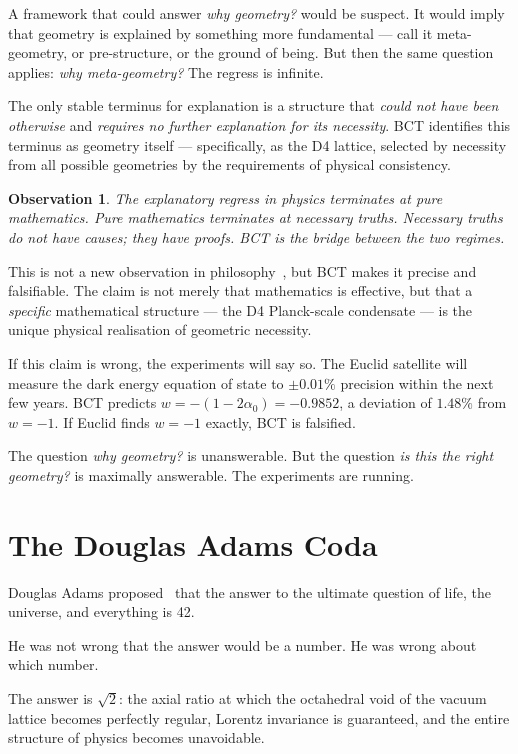 \documentclass[aps,prl,twocolumn,superscriptaddress,floatfix]{revtex4-2}
\newtheorem{observation}{Observation}
\newcommand{\azero}{\alpha_0}
\begin{document}
A framework that could answer \emph{why geometry?} would be suspect. 
It would imply that geometry is explained by something more 
fundamental --- call it meta-geometry, or pre-structure, or the 
ground of being. But then the same question applies: \emph{why 
meta-geometry?} The regress is infinite.

The only stable terminus for explanation is a structure that 
\emph{could not have been otherwise} and \emph{requires no further 
explanation for its necessity}. BCT identifies this terminus as 
geometry itself --- specifically, as the D4 lattice, selected by 
necessity from all possible geometries by the requirements of 
physical consistency.

\begin{observation}
The explanatory regress in physics terminates at pure mathematics. 
Pure mathematics terminates at necessary truths. Necessary truths 
do not have causes; they have proofs. BCT is the bridge between 
the two regimes.
\end{observation}

This is not a new observation in philosophy~\cite{Putnam1975}, 
but BCT makes it precise and falsifiable. The claim is not 
merely that mathematics is effective, but that a \emph{specific} 
mathematical structure --- the D4 Planck-scale condensate --- 
is the unique physical realisation of geometric necessity.

If this claim is wrong, the experiments will say so. The Euclid 
satellite will measure the dark energy equation of state to 
$\pm 0.01\%$ precision within the next few years. BCT predicts 
$w = -(1-2\azero) = -0.9852$, a deviation of $1.48\%$ from 
$w = -1$. If Euclid finds $w = -1$ exactly, BCT is falsified.

The question \emph{why geometry?} is unanswerable. But the 
question \emph{is this the right geometry?} is maximally answerable. 
The experiments are running.

\section{The Douglas Adams Coda}

Douglas Adams proposed~\cite{Adams1979} that the answer to the 
ultimate question of life, the universe, and everything is 42.

He was not wrong that the answer would be a number. He was wrong 
about which number.

The answer is $\sqrt{2}$: the axial ratio at which the octahedral 
void of the vacuum lattice becomes perfectly regular, Lorentz 
invariance is guaranteed, and the entire structure of physics 
becomes unavoidable.
\end{document}
